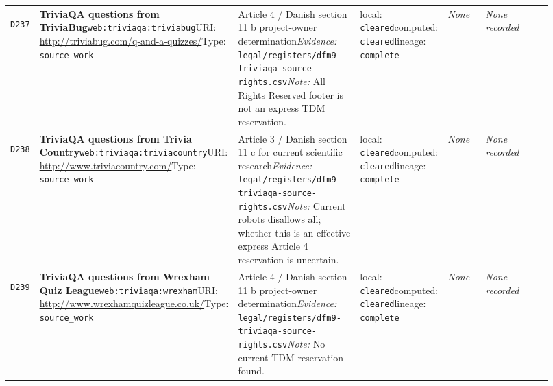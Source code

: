 \documentclass[9pt,a4paper]{article}
\newcommand{\depid}[1]{\hypertarget{dep:#1}{\texttt{#1}}}
\begin{document}
\begin{landscape}
\begin{longtable}{@{}L{0.035\linewidth}L{0.185\linewidth}L{0.27\linewidth}L{0.09\linewidth}L{0.10\linewidth}L{0.24\linewidth}@{}}
\depid{D237} & \textbf{TriviaQA questions from TriviaBug}\newline \nolinkurl{web:triviaqa:triviabug}\newline URI: \url{http://triviabug.com/q-and-a-quizzes/}\newline Type: \texttt{source\_work} & Article 4 / Danish section 11 b project-owner determination\newline \textit{Evidence:} \nolinkurl{legal/registers/dfm9-triviaqa-source-rights.csv}\newline \textit{Note:} All Rights Reserved footer is not an express TDM reservation. & local: \texttt{cleared}\newline computed: \texttt{cleared}\newline lineage: \texttt{complete} & \textit{None} & \textit{None recorded} \\
\depid{D238} & \textbf{TriviaQA questions from Trivia Country}\newline \nolinkurl{web:triviaqa:triviacountry}\newline URI: \url{http://www.triviacountry.com/}\newline Type: \texttt{source\_work} & Article 3 / Danish section 11 c for current scientific research\newline \textit{Evidence:} \nolinkurl{legal/registers/dfm9-triviaqa-source-rights.csv}\newline \textit{Note:} Current robots disallows all; whether this is an effective express Article 4 reservation is uncertain. & local: \texttt{cleared}\newline computed: \texttt{cleared}\newline lineage: \texttt{complete} & \textit{None} & \textit{None recorded} \\
\depid{D239} & \textbf{TriviaQA questions from Wrexham Quiz League}\newline \nolinkurl{web:triviaqa:wrexham}\newline URI: \url{http://www.wrexhamquizleague.co.uk/}\newline Type: \texttt{source\_work} & Article 4 / Danish section 11 b project-owner determination\newline \textit{Evidence:} \nolinkurl{legal/registers/dfm9-triviaqa-source-rights.csv}\newline \textit{Note:} No current TDM reservation found. & local: \texttt{cleared}\newline computed: \texttt{cleared}\newline lineage: \texttt{complete} & \textit{None} & \textit{None recorded} \\

\end{longtable}
\end{landscape}
\end{document}
